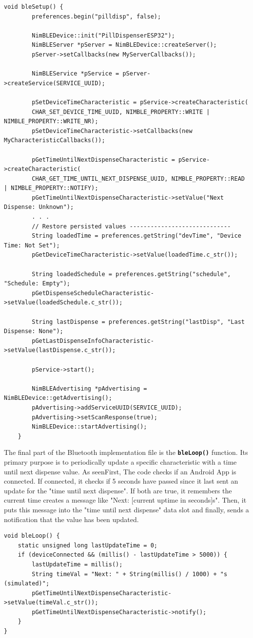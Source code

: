 \begin{lstlisting}[style=cppstyle, caption={bleSetup() function responsible for initializing the BLE stack}, label={lst:bleSetup}]
	void bleSetup() {
		preferences.begin("pilldisp", false);
		
		NimBLEDevice::init("PillDispenserESP32");
		NimBLEServer *pServer = NimBLEDevice::createServer();
		pServer->setCallbacks(new MyServerCallbacks());
		
		NimBLEService *pService = pServer->createService(SERVICE_UUID);
		
		pSetDeviceTimeCharacteristic = pService->createCharacteristic(
		CHAR_SET_DEVICE_TIME_UUID, NIMBLE_PROPERTY::WRITE | NIMBLE_PROPERTY::WRITE_NR);
		pSetDeviceTimeCharacteristic->setCallbacks(new MyCharacteristicCallbacks());
		
		pGetTimeUntilNextDispenseCharacteristic = pService->createCharacteristic(
		CHAR_GET_TIME_UNTIL_NEXT_DISPENSE_UUID, NIMBLE_PROPERTY::READ | NIMBLE_PROPERTY::NOTIFY);
		pGetTimeUntilNextDispenseCharacteristic->setValue("Next Dispense: Unknown");
		. . .		
		// Restore persisted values -----------------------------
		String loadedTime = preferences.getString("devTime", "Device Time: Not Set");
		pGetDeviceTimeCharacteristic->setValue(loadedTime.c_str());
		
		String loadedSchedule = preferences.getString("schedule", "Schedule: Empty");
		pGetDispenseScheduleCharacteristic->setValue(loadedSchedule.c_str());
		
		String lastDispense = preferences.getString("lastDisp", "Last Dispense: None");
		pGetLastDispenseInfoCharacteristic->setValue(lastDispense.c_str());
		
		pService->start();
		
		NimBLEAdvertising *pAdvertising = NimBLEDevice::getAdvertising();
		pAdvertising->addServiceUUID(SERVICE_UUID);
		pAdvertising->setScanResponse(true);
		NimBLEDevice::startAdvertising();
	}
\end{lstlisting}

The final part of the Bluetooth implementation file is the \textbf{\texttt{bleLoop()}} function. Its primary purpose is  to periodically update a specific characteristic with a time until next dispense value.  As seenFirst, The code checks if an Android App is connected. If connected, it checks if 5 seconds have passed since it last sent an update for the "time until next dispense". If both are true, it remembers the current time  creates a message like "Next: [current uptime in seconds]s". Then, it puts this message into the "time until next dispense" data slot and finally, sends a notification that the value has been updated.
\begin{lstlisting}[style=cppstyle, caption={bleLoop() function responsible for notification and time tracking}, label={lst:bleloop}]
void bleLoop() {
	static unsigned long lastUpdateTime = 0;
	if (deviceConnected && (millis() - lastUpdateTime > 5000)) {
		lastUpdateTime = millis();
		String timeVal = "Next: " + String(millis() / 1000) + "s (simulated)";
		pGetTimeUntilNextDispenseCharacteristic->setValue(timeVal.c_str());
		pGetTimeUntilNextDispenseCharacteristic->notify();
	}
}
\end{lstlisting}
